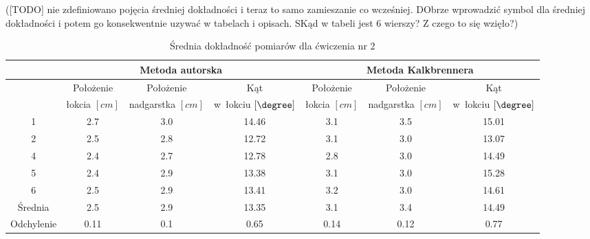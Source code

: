 ([TODO] nie zdefiniowano pojęcia średniej dokładności i teraz to samo zamieszanie co wcześniej. DObrze wprowadzić symbol dla średniej dokładności i potem go konsekwentnie uzywać w tabelach i opisach. SKąd w tabeli jest 6 wierszy? Z czego to się wzięło?)

\begin{table}[!htp]
	\caption{Średnia dokładność pomiarów dla ćwiczenia nr 2}
	\label{tab:experiments:sec:avg}
	\noindent
	\tiny
	\centering
	\begin{tabular}{|c|c|c|c|c|c|c|}
		\hline 
		& \multicolumn{3}{c|}{Metoda autorska} & \multicolumn{3}{c|}{Metoda Kalkbrennera}  \\ 
		\hline 
		           & Położenie    & Położenie       & Kąt                  & Położenie    & Położenie       & Kąt                  \\
		           & łokcia $[cm]$ & nadgarstka $[cm]$ & w~łokciu	$[\degree]$ & łokcia $[cm]$ & nadgarstka $[cm]$ & w~łokciu	$[\degree]$ \\
		\hline
		1          & 2.7            & 3.0               & 14.46                 & 3.1            & 3.5               & 15.01                 \\
		2          & 2.5            & 2.8               & 12.72                 & 3.1            & 3.0               & 13.07                 \\
		4          & 2.4            & 2.7               & 12.78                 & 2.8            & 3.0               & 14.49                 \\
		5          & 2.4            & 2.9               & 13.38                 & 3.1            & 3.0               & 15.28                 \\
		6          & 2.5            & 2.9               & 13.41                 & 3.2            & 3.0               & 14.61                 \\
		\hline
		Średnia   & 2.5            & 2.9               & 13.35                 & 3.1            & 3.4               & 14.49                 \\
		Odchylenie & 0.11           & 0.1               & 0.65                  & 0.14           & 0.12              & 0.77                  \\
		\hline
	\end{tabular} 
						
\end{table} 

